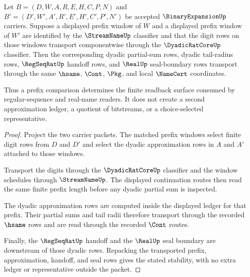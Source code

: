 \begin{theorem}
\label{thm:binary-expansion-window-prefix-stability}
Let $B=(D,W,A,R,E,H,C,P,N)$ and $B'=(D',W',A',R',E',H',C',P',N')$ be accepted $\BinaryExpansionUp$ carriers. Suppose a displayed prefix window of $W$ and a displayed prefix window of $W'$ are identified by the $\StreamNameUp$ classifier and that the digit rows on those windows transport componentwise through the $\DyadicRatCoreUp$ classifier. Then the corresponding dyadic partial-sum rows, dyadic tail-radius rows, $\RegSeqRatUp$ handoff rows, and $\RealUp$ seal-boundary rows transport through the same $\hsame$, $\Cont$, $\Pkg$, and local $\NameCert$ coordinates.

Thus a prefix comparison determines the finite readback surface consumed by regular-sequence and real-name readers. It does not create a second approximation ledger, a quotient of bitstreams, or a choice-selected representative.
\end{theorem}
\begin{proof}
Project the two carrier packets. The matched prefix windows select finite digit rows from $D$ and $D'$ and select the dyadic approximation rows in $A$ and $A'$ attached to those windows.

Transport the digits through the $\DyadicRatCoreUp$ classifier and the window schedules through $\StreamNameUp$. The displayed continuation routes then read the same finite prefix length before any dyadic partial sum is inspected.

The dyadic approximation rows are computed inside the displayed ledger for that prefix. Their partial sums and tail radii therefore transport through the recorded $\hsame$ rows and are read through the recorded $\Cont$ routes.

Finally, the $\RegSeqRatUp$ handoff and the $\RealUp$ seal boundary are downstream of those dyadic rows. Repacking the transported prefix, approximation, handoff, and seal rows gives the stated stability, with no extra ledger or representative outside the packet.
\end{proof}

